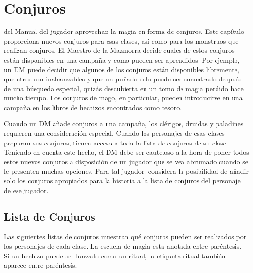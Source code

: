 \documentclass[a4paper,twocolumn,openany,10pt]{dndbook}
\begin{document}
\chapter{Conjuros}
 del Manual del jugador aprovechan la magia en forma de conjuros. Este
capítulo proporciona nuevos conjuros para esas clases, así como para los monstruos que realizan conjuros. El Maestro de la
Mazmorra decide cuales de estos conjuros están disponibles en una campaña y como pueden ser aprendidos. Por ejemplo, un DM puede
decidir que algunos de los conjuros están disponibles libremente, que otros son inalcanzables y que un puñado solo puede ser
encontrado después de una búsqueda especial, quizás descubierta en un tomo de magia perdido hace mucho tiempo. Los conjuros de
mago, en particular, pueden introducirse en una campaña en los libros de hechizos encontrados como tesoro.

Cuando un DM añade conjuros a una campaña, los clérigos, druidas y paladines requieren una consideración especial. Cuando los
personajes de esas clases preparan sus conjuros, tienen acceso a toda la lista de conjuros de su clase. Teniendo en cuenta este
hecho, el DM debe ser cauteloso a la hora de poner todos estos nuevos conjuros a disposición de un jugador que se vea abrumado
cuando se le presenten muchas opciones. Para tal jugador, considera la posibilidad de añadir solo los conjuros apropiados para
la historia a la lista de conjuros del personaje de ese jugador. 

\section{Lista de Conjuros}
Las siguientes listas de conjuros muestran qué conjuros pueden ser realizados por los personajes de cada clase. La escuela de
magia está anotada entre paréntesis. Si un hechizo puede ser lanzado como un ritual, la etiqueta ritual también aparece entre
paréntesis. 
\end{document}
